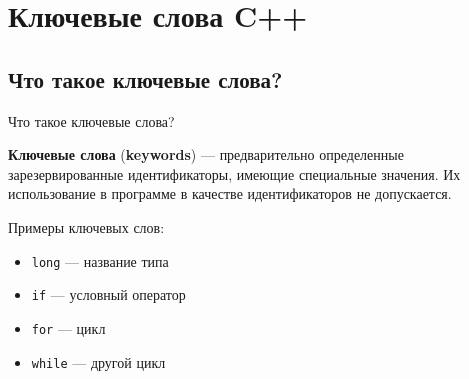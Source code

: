 \section{Ключевые слова C++}
\subsection{Что такое ключевые слова?}

\begin{frame}[t]{Что такое ключевые слова?}

\textbf{Ключевые слова} (\textbf{keywords}) --- предварительно определенные зарезервированные идентификаторы,
имеющие специальные значения. 
Их использование в программе в качестве идентификаторов не допускается.

Примеры ключевых слов:
  \begin{itemize}
    \item \texttt{long} --- название типа 
    \item \texttt{if} --- условный оператор
    \item \texttt{for} --- цикл
    \item \texttt{while} --- другой цикл
  \end{itemize}
  
\end{frame}
                                          
